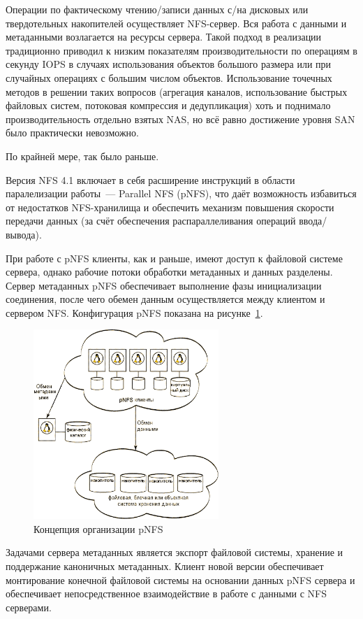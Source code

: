 \documentclass[10pt, a5paper]{article}
\begin{document}
Операции по фактическому чтению/записи  данных с/на дисковых или твердотельных накопителей осуществляет NFS-сервер. Вся работа с данными и метаданными возлагается  на  ресурсы сервера. Такой подход в реализации традиционно приводил к низким показателям производительности по операциям в секунду IOPS в случаях использования объектов большого размера или при случайных операциях  с большим числом объектов. Использование точечных методов в решении таких вопросов (агрегация каналов, использование быстрых файловых систем, потоковая компрессия и дедупликация) хоть и поднимало производительность отдельно взятых NAS, но всё равно  достижение уровня SAN  было практически невозможно.

По крайней мере, так было раньше.

Версия NFS 4.1 включает в себя расширение инструкций в области паралелизации работы~--- Parallel NFS (pNFS), что даёт возможность избавиться от недостатков  NFS-хранилища и обеспечить механизм повышения скорости передачи данных (за счёт обеспечения распараллеливания операций ввода/вывода).

При работе с pNFS клиенты, как и раньше, имеют доступ к файловой системе сервера, однако рабочие потоки обработки метаданных и  данных разделены. Сервер метаданных pNFS обеспечивает выполнение фазы инициализации соединения, после чего обемен данным осуществляется между клиентом и сервером NFS. Конфигурация pNFS показана на рисунке~\ref{Sharpio2}.

\begin{center}
\begin{figure}[h!]
  \centering
  \includegraphics[width=7cm]{16_2018_Sharpio2}
  \caption{Концепция организации pNFS}
  \label{Sharpio2}
\end{figure}
\end{center} 

Задачами  сервера метаданных  является  экспорт файловой системы, хранение и поддержание каноничных метаданных. Клиент новой версии обеспечивает монтирование конечной файловой системы на основании данных pNFS сервера и обеспечивает непосредственное взаимодействие в работе с данными с NFS серверами.
\end{document}
